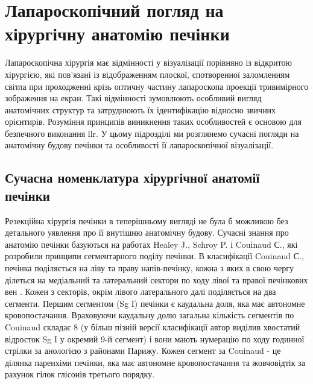\section{Лапароскопічний погляд на хірургічну анатомію печінки}

Лапароскопічна хірургія має відмінності у візуалізації порівняно із відкритою хірургією, які пов'язані із відображенням плоскої, спотворенної заломленням світла при проходженні крізь оптичну частину лапароскопа проекції тривимірного зображення на екран. Такі відмінності зумовлюють особливий вигляд анатомічних структур та затруднюють їх ідентифікацію відносно звичних орієнтирів. Розуміння принципів виникнення таких особливостей є основою для безпечного виконання \acrshort{llr}. У цьому підрозділі ми розглянемо сучасні погляди на анатомічну будову печінки та особливості її лапароскопічної візуалізації.

\subsection{Сучасна номенклатура хірургічної анатомії печінки}

Резекційна хірургія печінки в теперішньому вигляді не була б можливою без детального уявлення про її внутішню анатомічну будову. Сучасні знання про анатомію печінки базуються на работах Healey J., Schroy P. і Couinaud С., які розробили принципи сегментарного поділу печінки. В класифікації Couinaud С., печінка поділяється на ліву та праву напів-печінку, кожна з яких в свою чергу ділеться на медіальний та латеральний сектори по ходу лівої та правої печінкових вен \cite{COUINAUD1954}. Кожен з секторів, окрім лівого латерального далі поділяється на два сегменти. Першим сегментом (Sg I) печінки є каудальна доля, яка має автономне кровопостачання. Враховуючи каудальну долю загальна кількість сегментів по Couinaud складає 8 (у більш пізній версії класифікації автор виділив хвостатий відросток Sg I у окремий 9-й сегмент) і вони мають нумерацію по ходу годинної стрілки за анологією з районами Парижу. Кожен сегмент за Couinaud - це ділянка паренхіми печінки, яка має автономне кровопостачання та жовчовідтік за рахунок гілок глісонів третього порядку. 

